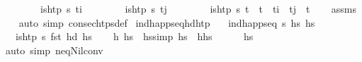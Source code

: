 \begin{isabellebody}
\ \ \ \ \ \ \ \ {\isachardoublequoteopen}is{\isacharunderscore}{\kern0pt}htp\ {\isasympi}s\ t\isactrlsub i{\isachardoublequoteclose}\isanewline
\ \ \ \ \ \ \ \ {\isachardoublequoteopen}is{\isacharunderscore}{\kern0pt}htp\ {\isasympi}s\ t\isactrlsub j{\isachardoublequoteclose}\isanewline
\ \ \ \ \ \ \ \ {\isachardoublequoteopen}is{\isacharunderscore}{\kern0pt}htp\ {\isasympi}s\ t\ {\isasymLongrightarrow}\ t\ {\isasymle}\ t\isactrlsub i\ {\isasymor}\ t\isactrlsub j\ {\isasymle}\ t{\isachardoublequoteclose}\isanewline
%
\isadelimproof
\ \ %
\endisadelimproof
%
\isatagproof
{}\isamarkupfalse%
\ assms\isanewline
\ \ \isamarkupfalse%
\ {\isacharparenleft}{\kern0pt}auto\ simp{\isacharcolon}{\kern0pt}\ consec{\isacharunderscore}{\kern0pt}htps{\isacharunderscore}{\kern0pt}def{\isacharparenright}{\kern0pt}%
\endisatagproof
{\isafoldproof}%
%
\isadelimproof
\isanewline
%
\endisadelimproof
\isanewline
{}\isamarkupfalse%
\ ind{\isacharunderscore}{\kern0pt}happ{\isacharunderscore}{\kern0pt}seq{\isacharunderscore}{\kern0pt}hd{\isacharunderscore}{\kern0pt}htp{\isacharcolon}{\kern0pt}\isanewline
\ \ \ {\isachardoublequoteopen}ind{\isacharunderscore}{\kern0pt}happ{\isacharunderscore}{\kern0pt}seq\ {\isasympi}s\ hs{\isachardoublequoteclose}\ {\isachardoublequoteopen}hs\ {\isasymnoteq}\ {\isacharbrackleft}{\kern0pt}{\isacharbrackright}{\kern0pt}{\isachardoublequoteclose}\isanewline
\ \ \ {\isachardoublequoteopen}is{\isacharunderscore}{\kern0pt}htp\ {\isasympi}s\ {\isacharparenleft}{\kern0pt}fst\ {\isacharparenleft}{\kern0pt}hd\ hs{\isacharparenright}{\kern0pt}{\isacharparenright}{\kern0pt}{\isachardoublequoteclose}\isanewline
%
\isadelimproof
%
\endisadelimproof
%
\isatagproof
{}\isamarkupfalse%
{\isacharminus}{\kern0pt}\isanewline
\ \ \isamarkupfalse%
\ h\ hs{\isacharprime}{\kern0pt}\ \ hs{\isacharbrackleft}{\kern0pt}simp{\isacharbrackright}{\kern0pt}{\isacharcolon}{\kern0pt}\ {\isachardoublequoteopen}hs\ {\isacharequal}{\kern0pt}\ h{\isacharhash}{\kern0pt}hs{\isacharprime}{\kern0pt}{\isachardoublequoteclose}\isanewline
\ \ \ \ \isamarkupfalse%
\ {\isacartoucheopen}hs\ {\isasymnoteq}\ {\isacharbrackleft}{\kern0pt}{\isacharbrackright}{\kern0pt}{\isacartoucheclose}\isanewline
\ \ \ \ \isamarkupfalse%
\ {\isacharparenleft}{\kern0pt}auto\ simp{\isacharcolon}{\kern0pt}\ neq{\isacharunderscore}{\kern0pt}Nil{\isacharunderscore}{\kern0pt}conv{\isacharparenright}{\kern0pt}\isanewline

\end{isabellebody}
